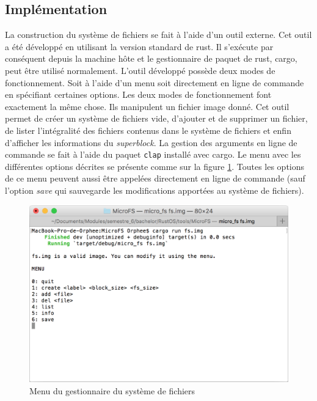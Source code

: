 
\subsection{Implémentation}
La construction du système de fichiers se fait à l'aide d'un outil externe. Cet
outil a été développé en utilisant la version standard de rust. Il s'exécute
par conséquent depuis la machine hôte et le gestionnaire de paquet de rust, cargo,
peut être utilisé normalement. L'outil développé possède deux
modes de fonctionnement. Soit à l'aide d'un menu soit directement en ligne de
commande en spécifiant certaines options. Les deux modes de fonctionnement
font exactement la même chose. Ils manipulent un fichier image donné.
Cet outil permet de créer un système de fichiers vide, d'ajouter et de supprimer
un fichier, de lister l'intégralité des fichiers contenus dans le système de fichiers et enfin
d'afficher les informations du \textit{superblock}. La gestion des arguments en
ligne de commande se fait à l'aide du paquet \texttt{clap} installé avec
cargo. Le menu avec les différentes options décrites se présente comme sur la figure
\ref{microfs_menu}. Toutes les options de ce menu peuvent aussi être appelées
directement en ligne de commande (sauf l'option \textit{save} qui sauvegarde les
modifications apportées au système de fichiers). \\ 

\begin{figure}[!h]
  \centering
  \includegraphics[scale=0.6]{images/microfs_menu.png}
  \caption{Menu du gestionnaire du système de fichiers}
  \label{microfs_menu}
\end{figure}

